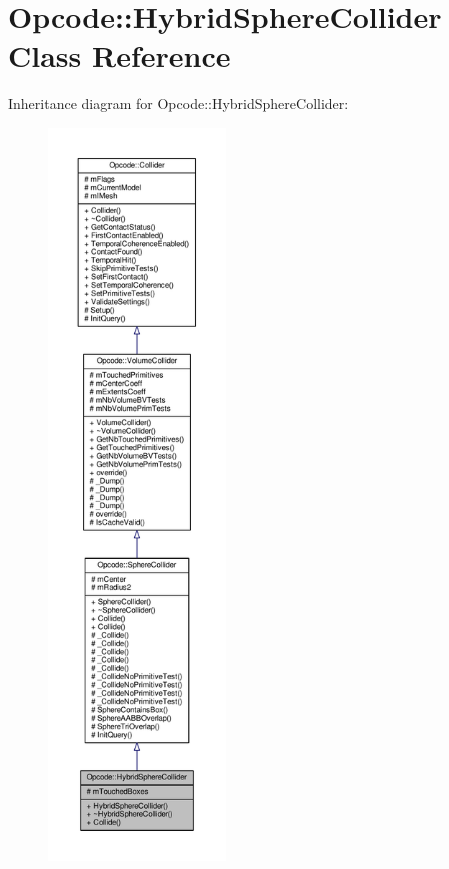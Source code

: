 \hypertarget{classOpcode_1_1HybridSphereCollider}{}\section{Opcode\+:\+:Hybrid\+Sphere\+Collider Class Reference}
\label{classOpcode_1_1HybridSphereCollider}


Inheritance diagram for Opcode\+:\+:Hybrid\+Sphere\+Collider\+:
\nopagebreak
\begin{figure}[H]
\begin{center}
\leavevmode
\includegraphics[height=550pt]{d9/dbf/classOpcode_1_1HybridSphereCollider__inherit__graph}
\end{center}
\end{figure}


